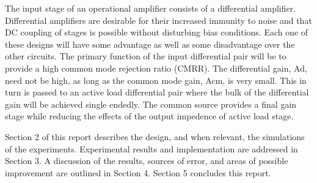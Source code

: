 The input stage of an operational amplifier consists of a differential amplifier. Differential amplifiers are
desirable for their increased immunity to noise and that DC coupling of stages is possible without disturbing bias conditions. Each one of these designs will have some
advantage as well as some disadvantage over the other circuits. The primary function of the input
differential pair will be to provide a high common mode rejection ratio (CMRR). The differential gain,
Ad, need not be high, as long as the common mode gain, Acm, is very small. This in turn is passed to an active load differential pair where the bulk of the differential gain will be achieved single endedly. The common source provides a final gain stage while reducing the effects of the output impedence of active load stage. 


\noindent Section 2 of this report describes the design, and when relevant, the simulations of the experiments. Experimental results and implementation are addressed in Section 3. A discussion of the results, sources of error, and areas of possible improvement are outlined in Section 4. Section 5 concludes this report. \newline

